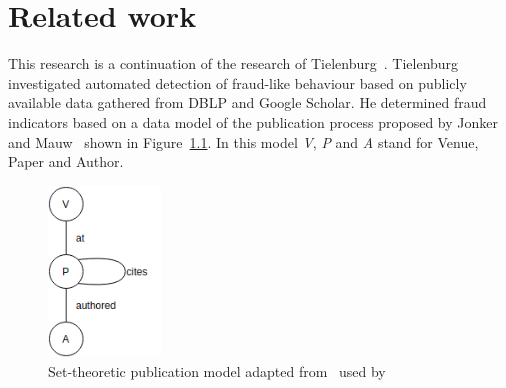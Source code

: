 \documentclass{ou-report}
\newcommand{\outline}[1]{{\color{blue} #1}}
\begin{document}
\chapter{Related work}
\label{chp:related_work}
This research is a continuation of the research of Tielenburg~\cite{TEJ2017}.
Tielenburg investigated automated detection of fraud-like behaviour based on
publicly available data ga\-thered from DBLP and Google Scholar. He determined 
fraud indicators based on a data model of the publication process proposed by 
Jonker and Mauw~\cite{JM2017} shown in Figure~\ref{fig:rw_jm2017}. In this 
model \textit{V}, \textit{P} and \textit{A} stand for Venue, Paper and Author.
\begin{figure}[H]
\centering
\includegraphics[width=3cm]{images/jm2017_undiced_pub_view.drawio.png}
\caption{Set-theoretic publication model adapted from~\cite{JM2017} used 
by~\cite{TEJ2017}}
\label{fig:rw_jm2017}
\end{figure}
\end{document}
